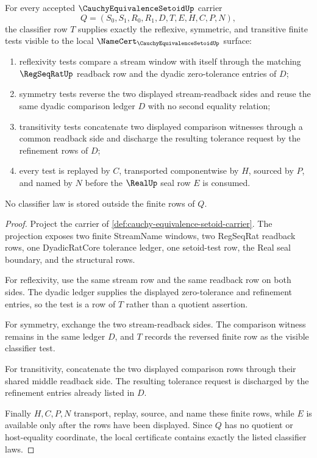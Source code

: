 \begin{theorem}
\label{thm:cauchy-equivalence-setoid-classifier-laws}
For every accepted $\CauchyEquivalenceSetoidUp$ carrier
$$
Q=(S_0,S_1,R_0,R_1,D,T,E,H,C,P,N),
$$
the classifier row $T$ supplies exactly the reflexive, symmetric, and transitive finite tests visible to the local $\NameCert_{\CauchyEquivalenceSetoidUp}$ surface:
\begin{enumerate}
\item reflexivity tests compare a stream window with itself through the matching $\RegSeqRatUp$ readback row and the dyadic zero-tolerance entries of $D$;
\item symmetry tests reverse the two displayed stream-readback sides and reuse the same dyadic comparison ledger $D$ with no second equality relation;
\item transitivity tests concatenate two displayed comparison witnesses through a common readback side and discharge the resulting tolerance request by the refinement rows of $D$;
\item every test is replayed by $C$, transported componentwise by $H$, sourced by $P$, and named by $N$ before the $\RealUp$ seal row $E$ is consumed.
\end{enumerate}
No classifier law is stored outside the finite rows of $Q$.
\end{theorem}
\begin{proof}
Project the carrier of \autoref{def:cauchy-equivalence-setoid-carrier}. The projection exposes two finite StreamName windows, two RegSeqRat readback rows, one DyadicRatCore tolerance ledger, one setoid-test row, the Real seal boundary, and the structural rows.

For reflexivity, use the same stream row and the same readback row on both sides. The dyadic ledger supplies the displayed zero-tolerance and refinement entries, so the test is a row of $T$ rather than a quotient assertion.

For symmetry, exchange the two stream-readback sides. The comparison witness remains in the same ledger $D$, and $T$ records the reversed finite row as the visible classifier test.

For transitivity, concatenate the two displayed comparison rows through their shared middle readback side. The resulting tolerance request is discharged by the refinement entries already listed in $D$.

Finally $H,C,P,N$ transport, replay, source, and name these finite rows, while $E$ is available only after the rows have been displayed. Since $Q$ has no quotient or host-equality coordinate, the local certificate contains exactly the listed classifier laws.
\end{proof}

